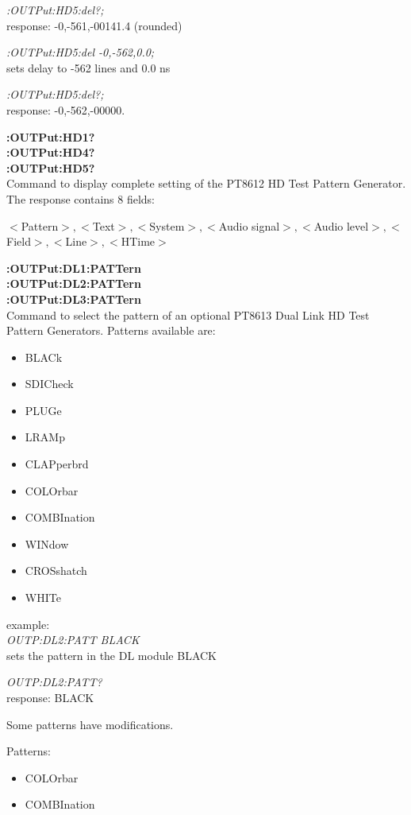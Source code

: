 \textit{:OUTPut:HD5:del?;}\\
response: -0,-561,-00141.4 (rounded)

\textit{:OUTPut:HD5:del -0,-562,0.0;}\\
sets delay to -562 lines and 0.0 ns

\textit{:OUTPut:HD5:del?;}\\
response: -0,-562,-00000.

\textbf{:OUTPut:HD1?}\\
\textbf{:OUTPut:HD4?}\\
\textbf{:OUTPut:HD5?}\\
Command to display complete setting of the PT8612 HD Test Pattern Generator.  The response contains 8 fields:

$<$Pattern$>,<$Text$>,<$System$>,<$Audio signal$>,<$Audio level$>,<$Field$>,<$Line$>,<$HTime$>$

\textbf{:OUTPut:DL1:PATTern}\\
\textbf{:OUTPut:DL2:PATTern}\\
\textbf{:OUTPut:DL3:PATTern}\\
Command to select the pattern of an optional PT8613 Dual Link HD Test Pattern Generators. Patterns available are:
  
\begin{itemize}
\item BLACk
\item SDICheck
\item PLUGe
\item LRAMp
\item CLAPperbrd
\item COLOrbar
\item COMBInation
\item WINdow
\item CROSshatch
\item WHITe
\end{itemize}

example:\\
\textit{OUTP:DL2:PATT BLACK}\\
sets the pattern in the DL module BLACK

\textit{OUTP:DL2:PATT?}\\
response: BLACK

Some patterns have modifications.

Patterns:

\begin{itemize}
\item COLOrbar
\item COMBInation
\end{itemize}

